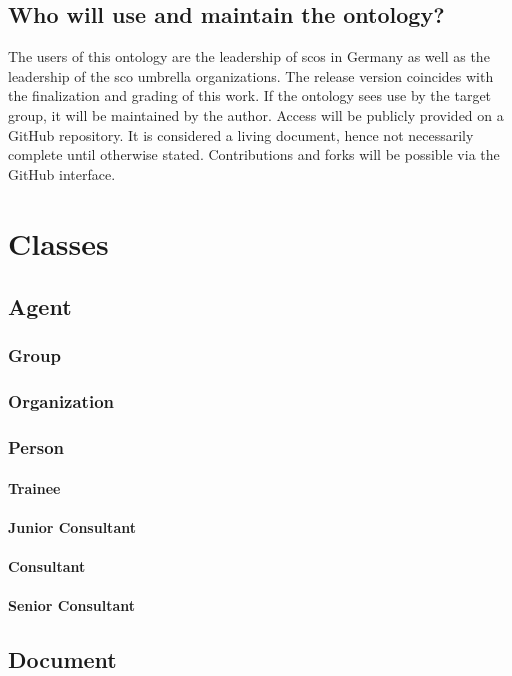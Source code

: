 \documentclass[a4paper, DIV=13, BCOR=0cm]{scrbook}
\begin{document}
\subsection{Who will use and maintain the ontology? }
The users of this ontology are the leadership of \glspl{sco} in Germany as well as the leadership of the \gls{sco} umbrella organizations. The release version coincides with the finalization and grading of this work. If the ontology sees use by the target group, it will be maintained by the author. Access will be publicly provided on a GitHub repository. It is considered a living document, hence not necessarily complete until otherwise stated. Contributions and forks will be possible via the GitHub interface.

\section{Classes}
\subsection{Agent}
\subsubsection{Group}
\subsubsection{Organization}
\subsubsection{Person}
\paragraph{Trainee}
\paragraph{Junior Consultant}
\paragraph{Consultant}
\paragraph{Senior Consultant}

\subsection{Document}
\end{document}
